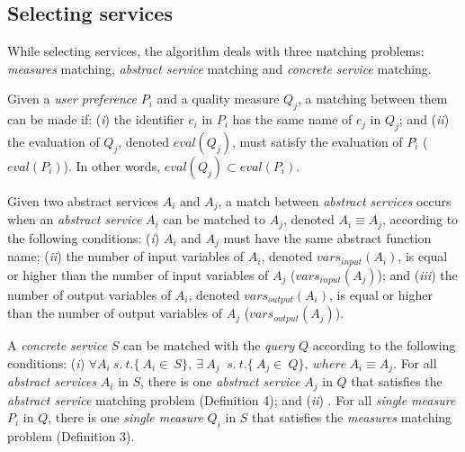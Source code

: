 \subsection{Selecting services}

While selecting services, the algorithm deals with three matching problems: \textit{measures} matching, \textit{abstract service} matching and \textit{concrete service} matching.

\begin{definition}
Given a \textit{user preference} $P_{i}$ and a quality measure $Q_{j}$, a matching between them can be made if:
(\textit{i}) the identifier $c_{i}$ in $P_{i}$ has the same name of $c_{j}$ in $Q_{j}$; and
(\textit{ii}) the evaluation of $Q_{j}$, denoted $eval(Q_{j})$, must satisfy the evaluation of $P_{i}$ ($eval(P_{i})$). In other words, $eval(Q_{j}) \subset eval(P_{i})$.
\end{definition}

\begin{definition}
Given two abstract services $A_{i}$ and $A_{j}$, a match between \textit{abstract services} occurs when an \textit{abstract service} $A_{i}$ can be matched to $A_{j}$, denoted $A_{i} \equiv A_{j}$, according to the following conditions: 
(\textit{i}) $A_{i}$ and $A_{j}$ must have the same abstract function name; 
(\textit{ii}) the number of input variables of $A_{i}$, denoted $vars_{input}(A_{i})$, is equal or higher than the number of input variables of $A_{j}$ ($vars_{input}(A_{j})$); and 
(\textit{iii}) the number of output variables of $A_{i}$, denoted $vars_{output}(A_{i})$, is equal or higher than the number of output variables of $A_{j}$ ($vars_{output}(A_{j})$).
\end{definition}

\begin{definition}
A \textit{concrete service} $S$ can be matched with the \textit{query} $Q$ according to the following conditions:
(\textit{i}) $\forall A_{i}  \ s. \ t. \lbrace\ A_{i} \in \ S\rbrace, \ \exists \ A_{j} \ $ $s. \ t. \lbrace\ A_{j} \in \ Q\rbrace, \ where \ A_{i} \equiv A_{j}.$ For all \textit{abstract services} $A_{i}$ in $S$, there is one \textit{abstract service} $A_{j}$ in $Q$ that satisfies the \textit{abstract service} matching problem (Definition 4); and
(\textit{ii}) . For all \textit{single measure} $P_{i}$ in $Q$, there is one \textit{single measure} $Q_{i}$ in $S$ that satisfies the \textit{measures} matching problem (Definition 3).
\end{definition}



